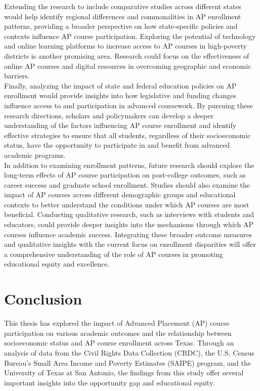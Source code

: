 \documentclass[sn-mathphys-num]{sn-jnl}%
\theoremstyle{thmstyleone}%
\theoremstyle{thmstyletwo}%
\theoremstyle{thmstylethree}%
\begin{document}
{Extending the research to include comparative studies across different states would help identify regional differences and commonalities in AP enrollment patterns, providing a broader perspective on how state-specific policies and contexts influence AP course participation. Exploring the potential of technology and online learning platforms to increase access to AP courses in high-poverty districts is another promising area. Research could focus on the effectiveness of online AP courses and digital resources in overcoming geographic and economic barriers.\\

Finally, analyzing the impact of state and federal education policies on AP enrollment would provide insights into how legislative and funding changes influence access to and participation in advanced coursework. By pursuing these research directions, scholars and policymakers can develop a deeper understanding of the factors influencing AP course enrollment and identify effective strategies to ensure that all students, regardless of their socioeconomic status, have the opportunity to participate in and benefit from advanced academic programs.\\

In addition to examining enrollment patterns, future research should explore the long-term effects of AP course participation on post-college outcomes, such as career success and graduate school enrollment. Studies should also examine the impact of AP courses across different demographic groups and educational contexts to better understand the conditions under which AP courses are most beneficial. Conducting qualitative research, such as interviews with students and educators, could provide deeper insights into the mechanisms through which AP courses influence academic success. Integrating these broader outcome measures and qualitative insights with the current focus on enrollment disparities will offer a comprehensive understanding of the role of AP courses in promoting educational equity and excellence.\\

\section{Conclusion}\label{sec13}

This thesis has explored the impact of Advanced Placement (AP) course participation on various academic outcomes and the relationship between socioeconomic status and AP course enrollment across Texas. Through an analysis of data from the Civil Rights Data Collection (CRDC), the U.S. Census Bureau’s Small Area Income and Poverty Estimates (SAIPE) program, and the University of Texas at San Antonio, the findings from this study offer several important insights into the opportunity gap and educational equity.\\

}
\end{document}
